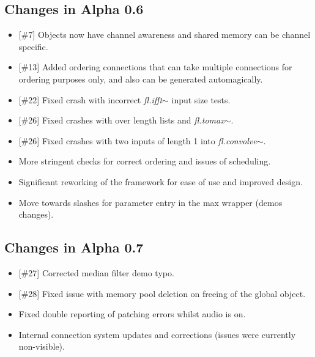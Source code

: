 \documentclass{article}
\newcommand{\flobject}[1]{\textit{fl.#1$\sim$}}
\begin{document}
\subsection{Changes in Alpha 0.6}
\vspace{0.1in}

\begin{itemize}
\item {[\#7]} Objects now have channel awareness and shared memory can be channel specific.
\item {[\#13]} Added ordering connections that can take multiple connections for ordering purposes only, and also can be generated automagically.
\item {[\#22]} Fixed crash with incorrect \flobject{ifft} input size tests.
\item {[\#26]} Fixed crashes with over length lists and \flobject{tomax}.
\item {[\#26]} Fixed crashes with two inputs of length 1 into \flobject{convolve}.
\item More stringent checks for correct ordering and issues of scheduling.
\item Significant reworking of the framework for ease of use and improved design.
\item Move towards slashes for parameter entry in the max wrapper (demos changes).
\end{itemize}

\subsection{Changes in Alpha 0.7}
\vspace{0.1in}

\begin{itemize}
\item {[\#27]} Corrected median filter demo typo.
\item {[\#28]} Fixed issue with memory pool deletion on freeing of the global object.
\item Fixed double reporting of patching errors whilst audio is on.
\item Internal connection system updates and corrections (issues were currently non-visible).
\end{itemize}
\end{document}
